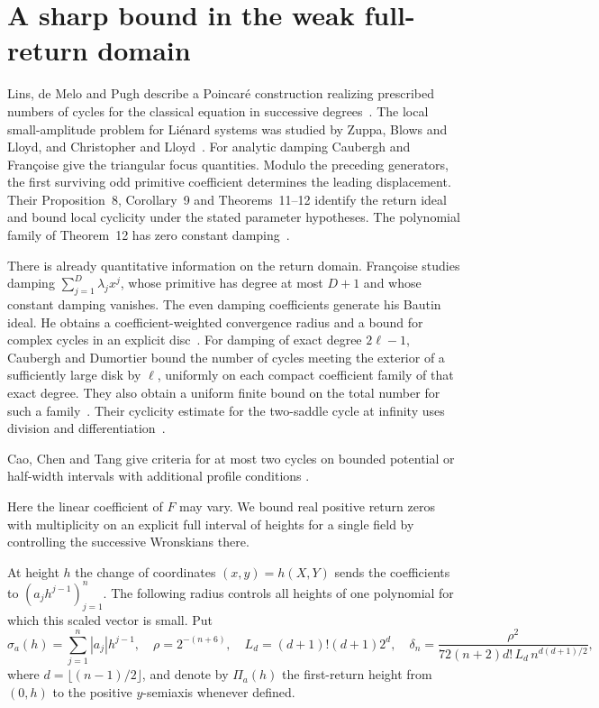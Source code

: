 \section{A sharp bound in the weak full-return domain}\label{sec:weak}
Lins, de Melo and Pugh describe a Poincar\'e construction realizing
prescribed numbers of cycles for the classical equation in successive
degrees~\cite[p.~336, account of \S3]{LMP1977}. The local small-amplitude
problem for Li\'enard systems was studied by Zuppa, Blows and Lloyd,
and Christopher and Lloyd~\cite{Zuppa1981,BL1984,CL1996}.
For analytic damping Caubergh and Fran\c{c}oise give the triangular
focus quantities. Modulo the preceding generators, the first surviving
odd primitive coefficient determines the leading displacement.
Their Proposition~8, Corollary~9 and Theorems~11--12 identify the return
ideal and bound local cyclicity under the stated parameter hypotheses.
The polynomial family of Theorem~12 has zero constant damping~\cite{CF2004}.

There is already quantitative information on the return domain.
Fran\c{c}oise studies damping $\sum_{j=1}^{D}\lambda_jx^j$, whose
primitive has degree at most $D+1$ and whose constant damping vanishes.
The even damping coefficients generate his Bautin ideal. He obtains a
coefficient-weighted convergence radius and a bound for complex cycles
in an explicit disc~\cite[Theorems~1.1, 2.3 and 3.8, (3.18)]{Fr2002}.
For damping of exact degree $2\ell-1$, Caubergh and Dumortier bound
the number of cycles meeting the exterior of a sufficiently large disk
by $\ell$, uniformly on each compact coefficient family of that exact
degree. They also obtain a uniform finite bound on the total number
for such a family~\cite[Theorems~1--2]{CD2008}. Their cyclicity
estimate for the two-saddle cycle at infinity uses division and
differentiation~\cite[\S8, Theorem~9]{CD2008}.

Cao, Chen and Tang give criteria for at most two cycles on bounded
potential or half-width intervals with additional profile conditions
\cite[Theorems~1.8--1.9]{CCT2026}.

Here the linear coefficient of $F$ may vary. We bound real positive
return zeros with multiplicity on an explicit full interval of heights
for a single field by controlling the successive Wronskians there.

At height $h$ the change of coordinates $(x,y)=h(X,Y)$ sends the coefficients to
$(a_jh^{j-1})_{j=1}^n$. The following radius controls all heights of one polynomial
for which this scaled vector is small. Put
\begin{equation}\label{eq:weak-defs}
  \sigma_a(h)=\sum_{j=1}^n |a_j|h^{j-1},\quad
  \rho=2^{-(n+6)},\quad
  L_d=(d+1)!(d+1)2^d,\quad
  \delta_n=\frac{\rho^2}{72(n+2)d!\,L_d\,n^{d(d+1)/2}},
\end{equation}
where $d=\lfloor(n-1)/2\rfloor$, and denote by $\Pi_a(h)$ the first-return height from $(0,h)$ to the positive $y$-semiaxis whenever defined.

